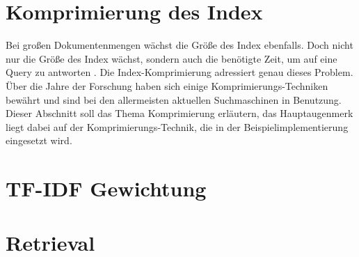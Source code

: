 \section{Komprimierung des Index}
Bei großen Dokumentenmengen wächst die Größe des Index ebenfalls. Doch nicht nur die Größe des Index wächst, sondern auch die benötigte Zeit, um auf eine Query zu antworten \cite{IR_Intro_Cambridge}.
Die Index-Komprimierung adressiert genau dieses Problem. Über die Jahre der Forschung haben sich einige Komprimierungs-Techniken bewährt und sind bei den allermeisten aktuellen Suchmaschinen in Benutzung. \newline
Dieser Abschnitt soll das Thema Komprimierung erläutern, das Hauptaugenmerk liegt dabei auf der Komprimierungs-Technik, die in der Beispielimplementierung eingesetzt wird.

\section{TF-IDF Gewichtung}

\section{Retrieval}